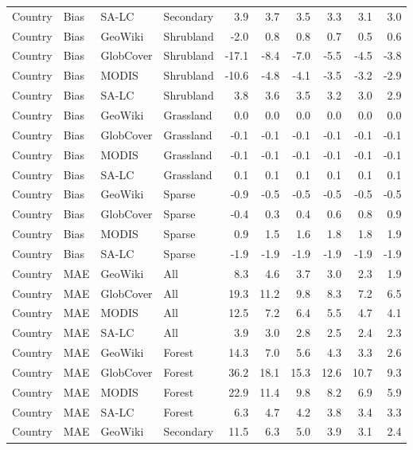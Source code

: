 \begin{longtable}{llllrrrrrr}
  Country & Bias & SA-LC & Secondary & 3.9 & 3.7 & 3.5 & 3.3 & 3.1 & 3.0 \\ 
  Country & Bias & GeoWiki & Shrubland & -2.0 & 0.8 & 0.8 & 0.7 & 0.5 & 0.6 \\ 
  Country & Bias & GlobCover & Shrubland & -17.1 & -8.4 & -7.0 & -5.5 & -4.5 & -3.8 \\ 
  Country & Bias & MODIS & Shrubland & -10.6 & -4.8 & -4.1 & -3.5 & -3.2 & -2.9 \\ 
  Country & Bias & SA-LC & Shrubland & 3.8 & 3.6 & 3.5 & 3.2 & 3.0 & 2.9 \\ 
  Country & Bias & GeoWiki & Grassland & 0.0 & 0.0 & 0.0 & 0.0 & 0.0 & 0.0 \\ 
  Country & Bias & GlobCover & Grassland & -0.1 & -0.1 & -0.1 & -0.1 & -0.1 & -0.1 \\ 
  Country & Bias & MODIS & Grassland & -0.1 & -0.1 & -0.1 & -0.1 & -0.1 & -0.1 \\ 
  Country & Bias & SA-LC & Grassland & 0.1 & 0.1 & 0.1 & 0.1 & 0.1 & 0.1 \\ 
  Country & Bias & GeoWiki & Sparse & -0.9 & -0.5 & -0.5 & -0.5 & -0.5 & -0.5 \\ 
  Country & Bias & GlobCover & Sparse & -0.4 & 0.3 & 0.4 & 0.6 & 0.8 & 0.9 \\ 
  Country & Bias & MODIS & Sparse & 0.9 & 1.5 & 1.6 & 1.8 & 1.8 & 1.9 \\ 
  Country & Bias & SA-LC & Sparse & -1.9 & -1.9 & -1.9 & -1.9 & -1.9 & -1.9 \\ 
  Country & MAE & GeoWiki & All & 8.3 & 4.6 & 3.7 & 3.0 & 2.3 & 1.9 \\ 
  Country & MAE & GlobCover & All & 19.3 & 11.2 & 9.8 & 8.3 & 7.2 & 6.5 \\ 
  Country & MAE & MODIS & All & 12.5 & 7.2 & 6.4 & 5.5 & 4.7 & 4.1 \\ 
  Country & MAE & SA-LC & All & 3.9 & 3.0 & 2.8 & 2.5 & 2.4 & 2.3 \\ 
  Country & MAE & GeoWiki & Forest & 14.3 & 7.0 & 5.6 & 4.3 & 3.3 & 2.6 \\ 
  Country & MAE & GlobCover & Forest & 36.2 & 18.1 & 15.3 & 12.6 & 10.7 & 9.3 \\ 
  Country & MAE & MODIS & Forest & 22.9 & 11.4 & 9.8 & 8.2 & 6.9 & 5.9 \\ 
  Country & MAE & SA-LC & Forest & 6.3 & 4.7 & 4.2 & 3.8 & 3.4 & 3.3 \\ 
  Country & MAE & GeoWiki & Secondary & 11.5 & 6.3 & 5.0 & 3.9 & 3.1 & 2.4 \\ 

\end{longtable}
